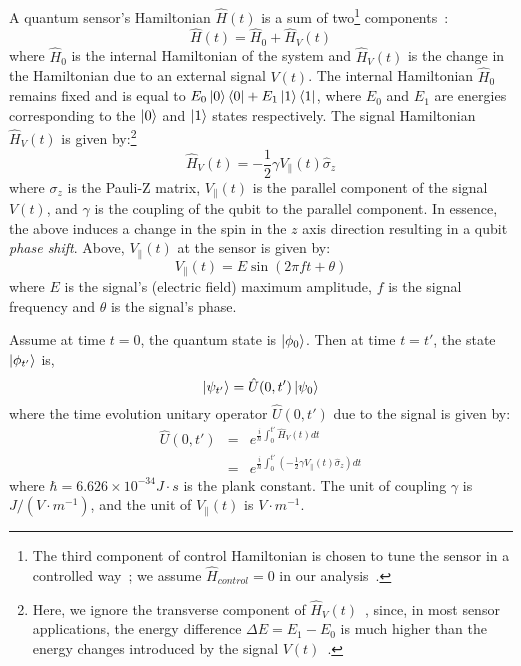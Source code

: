 A quantum sensor's Hamiltonian $\hat{H}(t)$ is a sum of two\footnote{The third component 
of control Hamiltonian is chosen to tune the sensor in a controlled way~\cite{RevModPhys.quantumsensing}; we assume $\hat{H}_{control}=0$ in our analysis~\cite{egerstrom}.}
components~\cite{RevModPhys.quantumsensing}:
$$\hat{H}(t) = \hat{H}_0 + \hat{H}_V(t)$$
where $\hat{H}_0$ is the internal Hamiltonian of the system and
$\hat{H}_V(t)$ is the change in the Hamiltonian due to an external signal $V(t)$.
The internal Hamiltonian $\hat{H}_0$ remains fixed and is equal to $E_0 \ket{0}\bra{0} + E_1\ket{1}\bra{1}$, where $E_0$ and $E_1$ are energies corresponding to the 
$\ket{0}$ and $\ket{1}$ states respectively. 
The signal Hamiltonian $\hat{H}_V(t)$ is given by:\footnote{Here, we ignore the 
transverse component of $\hat{H}_V(t)$~\cite{egerstrom}, since, in most sensor applications, the
energy difference $\Delta E = E_1 - E_0$ is much higher than the energy 
changes introduced by the signal $V(t)$~\cite{RevModPhys.quantumsensing}.}
$$\hat{H}_{V}(t) =  -\frac{1}{2}\gamma V_{\parallel}(t)\hat{\sigma}_z$$
where $\sigma_z$ is the Pauli-Z matrix, $V_{\parallel}(t)$ is the parallel component of the signal $V(t)$, and $\gamma$ is the coupling of the qubit to the parallel component.
In essence, the above induces a change in the spin in the $z$ axis direction resulting
in a  qubit \emph{phase shift}. Above, 
${V_{\parallel}}(t)$ at the sensor is given by:
$$V_{\parallel}(t) = E \sin(2\pi f  t + \theta)$$
where $E$ is the signal's (electric field) maximum amplitude, $f$ is the signal 
frequency and $\theta$ is the signal's phase.

 Assume at time $t=0$, the quantum state is $\ket{\phi_0}$. Then at time $t=t'$, the state $\ket{\phi_{t'}}$ is,
$$ \ket{\psi_{t'}} = \hat{U}(0, t') \ket{\psi_0} $$
where the time evolution unitary operator $\hat{U}(0, t')$ due to the signal is given by:
\begin{eqnarray*}
\hat{U}(0, t') &=& e^{\frac{i}{\hbar} \int_{0}^{t'} \hat{H}_V(t) dt}  \\
&=& e^{\frac{i}{\hbar} \int_{0}^{t'} (-\frac{1}{2}\gamma V_{\parallel}(t)\hat{\sigma}_z) dt} 
\end{eqnarray*}
where $\hbar=6.626\times 10^{-34} J\cdot s$ is the plank constant.
The unit of coupling $\gamma$ is $J/(V\cdot m^{-1})$, and the unit of $V_{\parallel}(t)$ is $V\cdot m^{-1}$.

